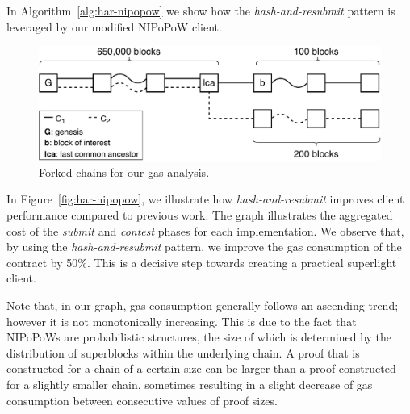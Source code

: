 In Algorithm~\ref{alg:har-nipopow} we show how the \emph{hash-and-resubmit} pattern
is leveraged by our modified NIPoPoW client.

\begin{figure}
    \begin{center}
        \includegraphics[width=1\columnwidth]{figures/nipopow-subm-cont}
    \end{center}
    \caption{Forked chains for our gas analysis.}
    \label{fig:chains}
\end{figure}

In Figure~\ref{fig:har-nipopow}, we illustrate how \emph{hash-and-resubmit}
improves client performance compared to previous work. The graph
illustrates the aggregated cost of the \emph{submit} and \emph{contest} phases for
each implementation. We observe that, by using the \emph{hash-and-resubmit}
pattern, we improve the gas consumption of the contract by 50\%. This
is a decisive step towards creating a practical superlight client.

Note that, in our graph, gas consumption generally follows an ascending trend; however it
is not monotonically increasing. This is due to the fact that
NIPoPoWs are probabilistic structures, the size of which is determined by the
distribution of superblocks within the underlying chain. A proof that is
constructed for a chain of a certain size can be larger than a proof
constructed for a slightly smaller chain, sometimes resulting in a slight decrease
of gas consumption between consecutive values of proof sizes.



